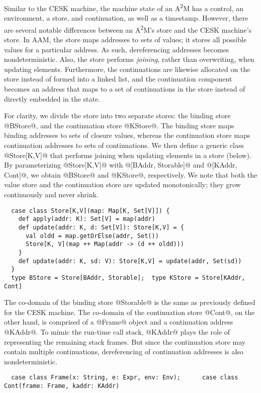\documentclass[acmsmall, screen]{acmart}\settopmatter{}
\begin{document}
Similar to the CESK machine, the machine state of an A\textsuperscript{2}M has a control, an environment, a store,
and continuation, as well as a timestamp. However, there are several notable differences
between an A\textsuperscript{2}M's store and the CESK machine's store. In AAM, the store maps addresses to sets of
values; it stores all possible values for a particular address. As such, dereferencing
addresses becomes nondeterministic. Also, the store performs \emph{joining}, rather than
overwriting, when updating elements. Furthermore, the continuations are likewise allocated
on the store instead of formed into a linked list, and the continuation component becomes
an address that maps to a set of continuations in the store instead of directly embedded
in the state.

For clarity, we divide the store into two separate stores: the binding store @BStore@, and
the continuation store @KStore@.
The binding store maps binding addresses to sets of closure values, whereas the continuation
store maps continuation addresses to sets of continuations.
We then define a generic class @Store[K,V]@ that performs joining when updating elements
in a store (below). By parameterizing @Store[K,V]@ with @[BAddr, Storable]@ and
@[KAddr, Cont]@, we obtain @BStore@ and @KStore@, respectively.
We note that both the value store and the continuation store are updated monotonically;
they grow continuously and never shrink.

\begin{lstlisting}
  case class Store[K,V](map: Map[K, Set[V]]) {
    def apply(addr: K): Set[V] = map(addr)
    def update(addr: K, d: Set[V]): Store[K,V] = {
      val oldd = map.getOrElse(addr, Set())
      Store[K, V](map ++ Map(addr -> (d ++ oldd)))
    }
    def update(addr: K, sd: V): Store[K,V] = update(addr, Set(sd))
  }
  type BStore = Store[BAddr, Storable];  type KStore = Store[KAddr, Cont]
\end{lstlisting}

The co-domain of the binding store @Storable@ is the same as previously defined for the CESK
machine. The co-domain of the continuation store @Cont@, on the other hand, is comprised of
a @Frame@ object and a continuation address @KAddr@. To mimic the run-time call stack,
@KAddr@ plays the role of representing the remaining stack frames.
But since the continuation store may contain multiple continuations, dereferencing
of continuation addresses is also nondeterministic.

\begin{lstlisting}
  case class Frame(x: String, e: Expr, env: Env);      case class Cont(frame: Frame, kaddr: KAddr)
\end{lstlisting}
\end{document}
